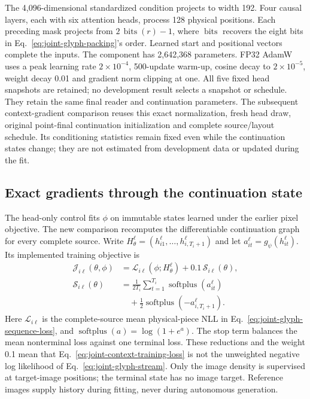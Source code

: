 \documentclass[12pt,a4paper]{article}
\providecommand{\DIFadd}[1]{{\protect\color{blue} \sf #1}} %
\begin{document}
\DIFadd{The 4,096-dimensional standardized condition projects to width 192. Four
causal layers, each with six attention heads, process 128 physical positions.
Each preceding mask projects from $2\,\operatorname{bits}(r)-1$, where
$\operatorname{bits}$ recovers the eight bits in Eq.~\ref{eq:joint-glyph-packing}'s
order. Learned start and positional vectors complete the inputs. The component has 2,642,368
parameters. FP32 AdamW uses a peak learning rate $2\times10^{-4}$, 500-update
warm-up, cosine decay to $2\times10^{-5}$, weight decay 0.01 and gradient norm
clipping at one. All five fixed head snapshots are retained; no development
result selects a snapshot or schedule. They retain the same final reader and
continuation parameters. The subsequent context-gradient comparison reuses
this exact normalization, fresh head draw, original point-final continuation
initialization and complete source/layout schedule. Its conditioning statistics
remain fixed even while the continuation states change; they are not estimated
from development data or updated during the fit.
}

\subsection*{\DIFadd{Exact gradients through the continuation state}}
\DIFadd{The head-only control fits $\phi$ on immutable states learned under the earlier
pixel objective. The new comparison recomputes the differentiable continuation
graph for every complete source. Write
$H_\theta^\ell=(h_{i1}^\ell,\ldots,h_{i,T_i+1}^\ell)$ and let
$a_{it}^\ell=g_\psi(h_{it}^\ell)$. Its implemented training objective is
}\begin{equation}
 \begin{aligned}
 \mathcal J_{i\ell}(\theta,\phi)
 &=\mathcal L_{i\ell}(\phi;H_\theta^\ell)
       +0.1\,\mathcal S_{i\ell}(\theta),\\
 \mathcal S_{i\ell}(\theta)
 &=\frac{1}{2T_i}\sum_{t=1}^{T_i}
       \operatorname{softplus}(a_{it}^\ell)\\
 &\quad+\frac{1}{2}\operatorname{softplus}(-a_{i,T_i+1}^\ell).
 \end{aligned}
 \label{eq:joint-context-training-loss}
\end{equation}
\DIFadd{Here $\mathcal L_{i\ell}$ is the complete-source mean physical-piece NLL in
Eq.~\ref{eq:joint-glyph-sequence-loss}, and
$\operatorname{softplus}(a)=\log(1+e^a)$. The stop term balances the mean
nonterminal loss against one terminal loss. These reductions and the weight
0.1 mean that Eq.~\ref{eq:joint-context-training-loss} is not the unweighted
negative log likelihood of Eq.~\ref{eq:joint-glyph-stream}. Only the image
density is supervised at target-image positions; the terminal state has no
image target. Reference images supply history during fitting, never during
autonomous generation.
}
\end{document}
